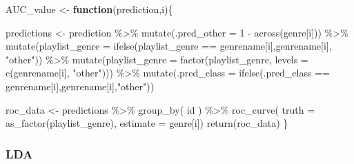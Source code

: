 \documentclass[
]{article}
\newenvironment{Shaded}{\begin{snugshade}}{\end{snugshade}}
\newcommand{\AttributeTok}[1]{\textcolor[rgb]{0.77,0.63,0.00}{#1}}
\newcommand{\ControlFlowTok}[1]{\textcolor[rgb]{0.13,0.29,0.53}{\textbf{#1}}}
\newcommand{\DecValTok}[1]{\textcolor[rgb]{0.00,0.00,0.81}{#1}}
\newcommand{\FunctionTok}[1]{\textcolor[rgb]{0.00,0.00,0.00}{#1}}
\newcommand{\NormalTok}[1]{#1}
\newcommand{\OtherTok}[1]{\textcolor[rgb]{0.56,0.35,0.01}{#1}}
\newcommand{\SpecialCharTok}[1]{\textcolor[rgb]{0.00,0.00,0.00}{#1}}
\newcommand{\StringTok}[1]{\textcolor[rgb]{0.31,0.60,0.02}{#1}}
\begin{document}
\begin{Shaded}
\begin{Highlighting}[]
\NormalTok{AUC\_value }\OtherTok{\textless{}{-}} \ControlFlowTok{function}\NormalTok{(prediction,i)\{}
  
\NormalTok{  predictions }\OtherTok{\textless{}{-}} 
\NormalTok{  prediction }\SpecialCharTok{\%\textgreater{}\%} 
  \FunctionTok{mutate}\NormalTok{(}\AttributeTok{.pred\_other =} \DecValTok{1} \SpecialCharTok{{-}} \FunctionTok{across}\NormalTok{(genre[i])) }\SpecialCharTok{\%\textgreater{}\%} 
  \FunctionTok{mutate}\NormalTok{(}\AttributeTok{playlist\_genre =} \FunctionTok{ifelse}\NormalTok{(playlist\_genre }\SpecialCharTok{==}\NormalTok{ genrename[i],genrename[i], }\StringTok{"other"}\NormalTok{)) }\SpecialCharTok{\%\textgreater{}\%} 
  \FunctionTok{mutate}\NormalTok{(}\AttributeTok{playlist\_genre =} \FunctionTok{factor}\NormalTok{(playlist\_genre, }\AttributeTok{levels =} \FunctionTok{c}\NormalTok{(genrename[i], }\StringTok{"other"}\NormalTok{))) }\SpecialCharTok{\%\textgreater{}\%} 
  \FunctionTok{mutate}\NormalTok{(}\AttributeTok{.pred\_class =} \FunctionTok{ifelse}\NormalTok{(.pred\_class }\SpecialCharTok{==}\NormalTok{ genrename[i],genrename[i],}\StringTok{"other"}\NormalTok{))}

\NormalTok{  roc\_data }\OtherTok{\textless{}{-}}\NormalTok{ predictions }\SpecialCharTok{\%\textgreater{}\%} \FunctionTok{group\_by}\NormalTok{( id ) }\SpecialCharTok{\%\textgreater{}\%} 
  \FunctionTok{roc\_curve}\NormalTok{( }\AttributeTok{truth =} \FunctionTok{as\_factor}\NormalTok{(playlist\_genre), }\AttributeTok{estimate =}\NormalTok{ genre[i])}
 \FunctionTok{return}\NormalTok{(roc\_data)}
\NormalTok{\}}
\end{Highlighting}
\end{Shaded}

\hypertarget{lda}{%
\subsubsection{LDA}\label{lda}}

\begin{Shaded}
\end{Shaded}
\end{document}
